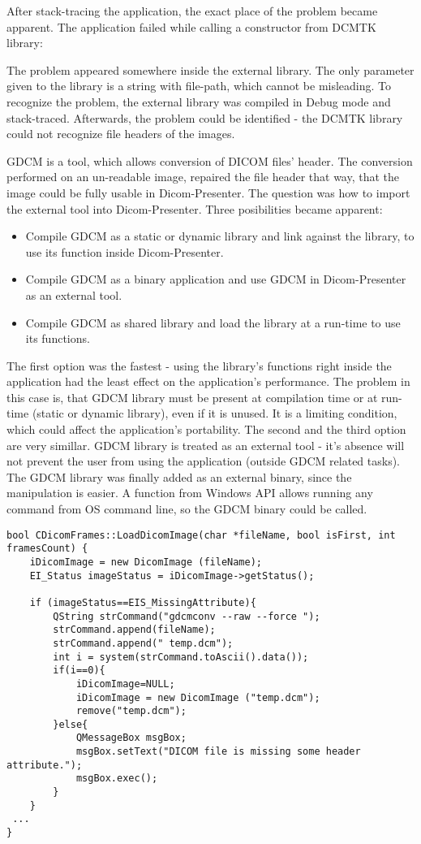 After stack-tracing the application, the exact place of the problem became apparent. The application failed while calling a constructor from DCMTK library:


The problem appeared somewhere inside the external library. The only parameter given to the library is a string with file-path, which cannot be misleading. To recognize the problem, the external library was compiled in Debug mode and stack-traced. Afterwards, the problem could be identified - the DCMTK library could not recognize file headers of the images.

GDCM is a tool, which allows conversion of DICOM files' header. The conversion performed on an un-readable image, repaired the file header that way, that the image could be fully usable in Dicom-Presenter. The question was how to import the external tool into Dicom-Presenter. Three posibilities became apparent:

\begin{itemize}
\item Compile GDCM as a static or dynamic library and link against the library, to use its function inside Dicom-Presenter.
\item Compile GDCM as a binary application and use GDCM in Dicom-Presenter as an external tool.
\item Compile GDCM as shared library and load the library at a run-time to use its functions.
\end{itemize}

The first option was the fastest - using the library's functions right inside the application had the least effect on the application's performance. The problem in this case is, that GDCM library must be present at compilation time or at run-time (static or dynamic library), even if it is unused. It is a limiting condition, which could affect the application's portability. The second and the third option are very simillar. GDCM library is treated as an external tool - it's absence will not prevent the user from using the application (outside GDCM related tasks). The GDCM library was finally added as an external binary, since the manipulation is easier. A  function from Windows  API allows running any command from OS command line, so the GDCM binary could be called.

\begin{lstlisting}[caption={A conversion of DICOM files header using GDCM as external tool.}]
bool CDicomFrames::LoadDicomImage(char *fileName, bool isFirst, int framesCount) {
	iDicomImage = new DicomImage (fileName);
	EI_Status imageStatus = iDicomImage->getStatus();

	if (imageStatus==EIS_MissingAttribute){			
		QString strCommand("gdcmconv --raw --force ");
		strCommand.append(fileName);
		strCommand.append(" temp.dcm");
		int i = system(strCommand.toAscii().data());
		if(i==0){
			iDicomImage=NULL;
			iDicomImage = new DicomImage ("temp.dcm");
			remove("temp.dcm");
		}else{
			QMessageBox msgBox;
			msgBox.setText("DICOM file is missing some header attribute.");
			msgBox.exec();
		}		
	}
 ...
}
\end{lstlisting}